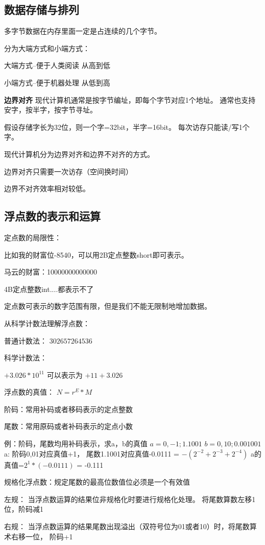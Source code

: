 \documentclass[12pt]{ctexart}
\begin{document}
\subsection{数据存储与排列}
多字节数据在内存里面一定是占连续的几个字节。

分为大端方式和小端方式：

大端方式--便于人类阅读 从高到低

小端方式--便于机器处理 从低到高

\textbf{边界对齐}
现代计算机通常是按字节编址，即每个字节对应1个地址。
通常也支持安字，按半字，按字节寻址。

假设存储字长为32位，则一个字=32bit，半字=16bit。
每次访存只能读/写1个字。

现代计算机分为边界对齐和边界不对齐的方式。

边界对齐只需要一次访存（空间换时间）

边界不对齐效率相对较低。

\subsection{浮点数的表示和运算}
定点数的局限性：

比如我的财富位-8540，可以用2B定点整数short即可表示。

马云的财富：10000000000000

4B定点整数int$....$都表示不了

定点数可表示的数字范围有限，但是我们不能无限制地增加数据。

从科学计数法理解浮点数：

普通计数法： $302657264536$

科学计数法：

$+3.026 * 10 ^{11}$
可以表示为 $+11 +3.026$

浮点数的真值： $ N = r ^  E * M$

阶码：常用补码或者移码表示的定点整数

尾数：常用原码或者补码表示的定点小数

例：阶码，尾数均用补码表示，求a，b的真值
$a = 0,-1;1.1001$
$b = 0,10;0.001001$
a: 阶码0,01对应真值+1， 尾数1.1001对应真值-0.0111 = $-(2^{-2}+2^{-3}+2^{-4})$
a的真值=$2^1 * (-0.0111)$ = -0.111 

规格化浮点数：规定尾数的最高位数值位必须是一个有效值

左规： 当浮点数运算的结果位非规格化时要进行规格化处理。
将尾数算数左移1位，阶码减1

右规： 当浮点数运算的结果尾数出现溢出（双符号位为01或者10）时，将尾数算术右移一位，
阶码+1
\end{document}
